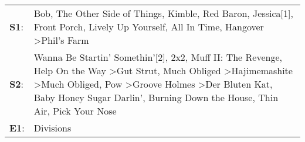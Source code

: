 \begin{supertabular}{p{0.03\textwidth}p{0.92\textwidth}}
 \textbf{S1}:  &                                                                                                                                                                                                                                                                                                        Bob\textsuperscript{}, \enspace The Other Side of Things\textsuperscript{}, \enspace Kimble\textsuperscript{}, \enspace Red Baron\textsuperscript{}, \enspace Jessica[1]\textsuperscript{}, \enspace Front Porch\textsuperscript{}, \enspace Lively Up Yourself\textsuperscript{}, \enspace All In Time\textsuperscript{}, \enspace Hangover\textsuperscript{} \textgreater \enspace Phil's Farm\textsuperscript{}  \enspace  \\
 \textbf{S2}:  &  Wanna Be Startin' Somethin'[2]\textsuperscript{}, \enspace 2x2\textsuperscript{}, \enspace Muff II: The Revenge\textsuperscript{}, \enspace Help On the Way\textsuperscript{} \textgreater \enspace Gut Strut\textsuperscript{}, \enspace Much Obliged\textsuperscript{} \textgreater \enspace Hajimemashite\textsuperscript{} \textgreater \enspace Much Obliged\textsuperscript{}, \enspace Pow\textsuperscript{} \textgreater \enspace Groove Holmes\textsuperscript{} \textgreater \enspace Der Bluten Kat\textsuperscript{}, \enspace Baby Honey Sugar Darlin'\textsuperscript{}, \enspace Burning Down the House\textsuperscript{}, \enspace Thin Air\textsuperscript{}, \enspace Pick Your Nose\textsuperscript{}  \enspace  \\
 \textbf{E1}:  &                                                                                                                                                                                                                                                                                                                                                                                                                                                                                                                                                                                                                                                                                               Divisions\textsuperscript{}  \enspace  \\
\end{supertabular}
